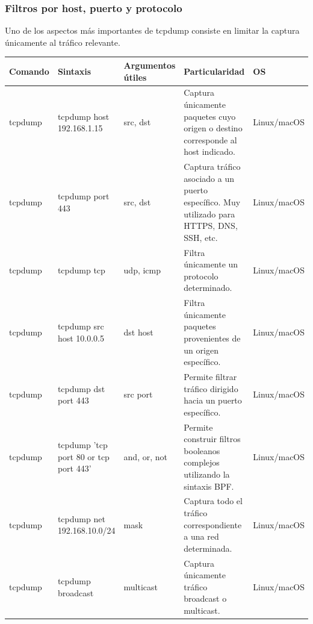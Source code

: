 \documentclass[a4paper,10pt]{article}
\begin{document}
\subsubsection{Filtros por host, puerto y protocolo}

Uno de los aspectos más importantes de tcpdump consiste en limitar la captura
únicamente al tráfico relevante.

\begin{longtable}{|p{2.8cm}|p{4.2cm}|p{3.5cm}|p{5cm}|p{1.5cm}|}

\hline
Comando &
Sintaxis &
Argumentos útiles &
Particularidad &
OS
\\
\hline
\endhead

tcpdump &
tcpdump host 192.168.1.15 &
src, dst &
Captura únicamente paquetes cuyo origen o destino corresponde al host indicado. &
Linux/macOS
\\
\hline

tcpdump &
tcpdump port 443 &
src, dst &
Captura tráfico asociado a un puerto específico. Muy utilizado para HTTPS, DNS, SSH, etc. &
Linux/macOS
\\
\hline

tcpdump &
tcpdump tcp &
udp, icmp &
Filtra únicamente un protocolo determinado. &
Linux/macOS
\\
\hline

tcpdump &
tcpdump src host 10.0.0.5 &
dst host &
Filtra únicamente paquetes provenientes de un origen específico. &
Linux/macOS
\\
\hline

tcpdump &
tcpdump dst port 443 &
src port &
Permite filtrar tráfico dirigido hacia un puerto específico. &
Linux/macOS
\\
\hline

tcpdump &
tcpdump 'tcp port 80 or tcp port 443' &
and, or, not &
Permite construir filtros booleanos complejos utilizando la sintaxis BPF. &
Linux/macOS
\\
\hline

tcpdump &
tcpdump net 192.168.10.0/24 &
mask &
Captura todo el tráfico correspondiente a una red determinada. &
Linux/macOS
\\
\hline

tcpdump &
tcpdump broadcast &
multicast &
Captura únicamente tráfico broadcast o multicast. &
Linux/macOS
\\
\hline

\end{longtable}


\end{document}
